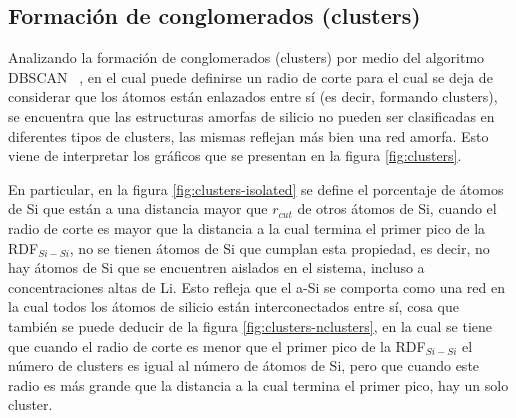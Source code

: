 \subsection{Formación de conglomerados (clusters)}\label{s:clusters}

Analizando la formación de conglomerados (clusters) por medio del algoritmo DBSCAN 
~\cite{ester1996}, en el cual puede definirse un radio de corte para el cual se 
deja de considerar que los átomos están enlazados entre sí (es decir, formando 
clusters), se encuentra que las estructuras amorfas de silicio no pueden ser 
clasificadas en diferentes tipos de clusters, las mismas reflejan más bien 
una red amorfa. Esto viene de interpretar los gráficos que se presentan en la 
figura \ref{fig:clusters}. 

En particular, en la figura \ref{fig:clusters-isolated} se define el porcentaje 
de átomos de Si que están a una distancia mayor que $r_{cut}$ de otros átomos de 
Si, cuando el radio de corte es mayor que la distancia a la cual termina el 
primer pico de la RDF$_{Si-Si}$, no se tienen átomos de Si que cumplan esta 
propiedad, es decir, no hay átomos de Si que se encuentren aislados en el sistema,
incluso a concentraciones altas de Li. Esto refleja que el a-Si se comporta como 
una red en la cual todos los átomos de silicio están interconectados entre sí, 
cosa que también se puede deducir de la figura \ref{fig:clusters-nclusters}, en la cual 
se tiene que cuando el radio de corte es menor que el primer pico de la RDF$_{Si-Si}$ 
el número de clusters es igual al número de átomos de Si, pero que cuando este 
radio es más grande que la distancia a la cual termina el primer pico, hay un 
solo cluster.


